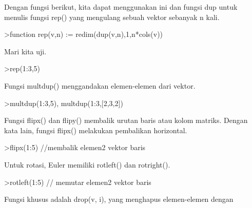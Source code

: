 \documentclass[12pt,arial,letterpaper]{book}
\begin{document}
\begin{eulercomment}
\begin{eulercomment}
\begin{eulercomment}
\begin{eulercomment}
\begin{euleroutput}
\end{euleroutput}
\begin{eulercomment}
Dengan fungsi berikut, kita dapat menggunakan ini dan fungsi dup untuk
menulis fungsi rep() yang mengulang sebuah vektor sebanyak n kali.
\end{eulercomment}
\begin{eulerprompt}
>function rep(v,n) := redim(dup(v,n),1,n*cols(v))
\end{eulerprompt}
\begin{eulercomment}
Mari kita uji.
\end{eulercomment}
\begin{eulerprompt}
>rep(1:3,5)
\end{eulerprompt}
\begin{euleroutput}
  [1,  2,  3,  1,  2,  3,  1,  2,  3,  1,  2,  3,  1,  2,  3]
\end{euleroutput}
\begin{eulercomment}
Fungsi multdup() menggandakan elemen-elemen dari vektor.
\end{eulercomment}
\begin{eulerprompt}
>multdup(1:3,5), multdup(1:3,[2,3,2])
\end{eulerprompt}
\begin{euleroutput}
  [1,  1,  1,  1,  1,  2,  2,  2,  2,  2,  3,  3,  3,  3,  3]
  [1,  1,  2,  2,  2,  3,  3]
\end{euleroutput}
\begin{eulercomment}
Fungsi flipx() dan flipy() membalik urutan baris atau kolom matriks.
Dengan kata lain, fungsi flipx() melakukan pembalikan horizontal.
\end{eulercomment}
\begin{eulerprompt}
>flipx(1:5) //membalik elemen2 vektor baris
\end{eulerprompt}
\begin{euleroutput}
  [5,  4,  3,  2,  1]
\end{euleroutput}
\begin{eulercomment}
Untuk rotasi, Euler memiliki rotleft() dan rotright().
\end{eulercomment}
\begin{eulerprompt}
>rotleft(1:5) // memutar elemen2 vektor baris
\end{eulerprompt}
\begin{euleroutput}
  [2,  3,  4,  5,  1]
\end{euleroutput}
\begin{eulercomment}
Fungsi khusus adalah drop(v, i), yang menghapus elemen-elemen dengan

\end{eulercomment}
\end{eulercomment}
\end{eulercomment}
\end{eulercomment}
\end{eulercomment}
\end{document}

